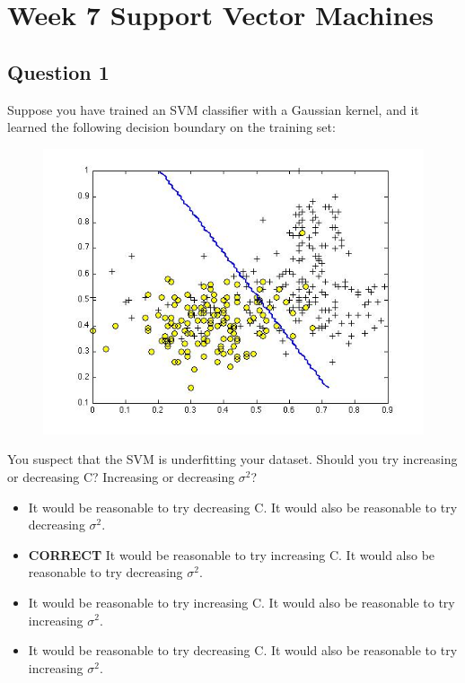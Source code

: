 \documentclass[11pt]{article} %
\begin{document}
	

\section*{Week 7 Support Vector Machines}


\subsection*{Question 1}
Suppose you have trained an SVM classifier with a Gaussian kernel, and it learned the following decision boundary on the training set:
\begin{figure}[h!]
\centering
\includegraphics[width=0.7\linewidth]{images/SVM1}
\end{figure}


You suspect that the SVM is underfitting your dataset. Should you try increasing or decreasing C? Increasing or decreasing $\sigma^2$?

\begin{itemize}
	\item It would be reasonable to try decreasing C. It would also be reasonable to try decreasing $\sigma^2$.
	
	\item \textbf{CORRECT} It would be reasonable to try increasing C. It would also be reasonable to try decreasing $\sigma^2$.
	
	\item It would be reasonable to try increasing C. It would also be reasonable to try increasing $\sigma^2$.
	
	\item It would be reasonable to try decreasing C. It would also be reasonable to try increasing $\sigma^2$.
\end{itemize}
\end{document}
